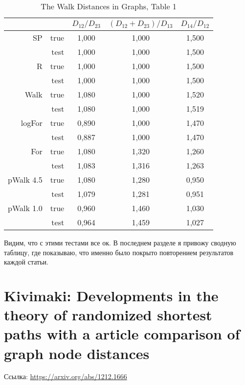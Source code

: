 \documentclass{article}
\begin{document}
\begin{table}[H]
\centering
\caption{The Walk Distances in Graphs, Table 1}
\label{my-label}
\begin{tabular}{rr|ccc}
          &      & $D_{12} / D_{23}$ & $(D_{12}+D_{23}) / D_{13}$ & $D_{14} / D_{12}$ \\
          \hline
SP        & true & 1,000       & 1,000               & 1,500       \\
          & test & 1,000       & 1,000               & 1,500       \\
          \cline{2-5}
R         & true & 1,000       & 1,000               & 1,500       \\
          & test & 1,000       & 1,000               & 1,500       \\
          \cline{2-5}
Walk      & true & 1,080       & 1,000               & 1,520       \\
          & test & 1,080       & 1,000               & 1,519       \\
          \cline{2-5}
logFor    & true & 0,890       & 1,000               & 1,470       \\
          & test & 0,887       & 1,000               & 1,470       \\
          \cline{2-5}
For       & true & 1,080       & 1,320               & 1,260       \\
          & test & 1,083       & 1,316               & 1,263       \\
          \cline{2-5}
pWalk 4.5 & true & 1,080       & 1,280               & 0,950       \\
          & test & 1,079       & 1,281               & 0,951       \\
          \cline{2-5}
pWalk 1.0 & true & 0,960       & 1,460               & 1,030       \\
          & test & 0,964       & 1,459               & 1,027      
\end{tabular}
\end{table}

Видим, что с этими тестами все ок. В последнем разделе я привожу сводную таблицу, где показываю, что именно было покрыто повторением результатов каждой статьи.

\section{Kivimaki: Developments in the theory of randomized shortest paths with a article comparison of graph node distances}
Ссылка: \url{https://arxiv.org/abs/1212.1666}
\end{document}

